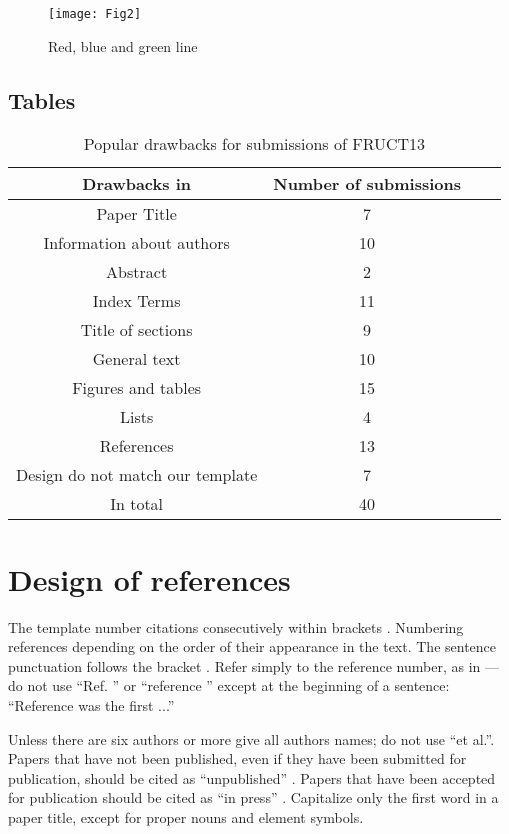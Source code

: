 \documentclass[conference]{IEEEtran}
\begin{document}
\begin{figure}[h]
	\centering
	\texttt{[image: Fig2]}
	\caption{Red, blue and green line}
	\label{fig2}
\end{figure}

\subsection{Tables}

\begin{table}[h]
\centering
\label{tab1}
\caption{Popular drawbacks for submissions of FRUCT13}\vspace{4pt}
\begin{tabular}{|c|c|c|c|}

		\hline
 		\textbf{Drawbacks in} & \textbf{Number of submissions} \\
 		\hline
		Paper Title & 7 \\
		\hline
		Information about authors & 10 \\
		\hline
		Abstract & 2 \\
		\hline
		Index Terms & 11 \\
		\hline
		Title of sections & 9 \\
		\hline
		General text & 10 \\
		\hline
		Figures and tables & 15 \\
		\hline
		Lists & 4 \\
		\hline
		References & 13 \\
		\hline
		Design do not match our template & 7 \\
		\hline
		In total & 40 \\
		\hline
\end{tabular}
\end{table}

\section{Design of references}

The template number citations consecutively within brackets \cite{Cover}. Numbering references depending on the order of their appearance in the text. The sentence punctuation follows the bracket \cite{Dobrushin}. Refer simply to the reference number, as in \cite{Blachman} --- do not use ``Ref. \cite{Blachman}'' or ``reference \cite{Blachman}'' except at the beginning of a sentence: ``Reference \cite{Blachman} was the first ...''

Unless there are six authors or more give all authors names; do not use ``et al.''. Papers that have not been published, even if they have been submitted for publication, should be cited as ``unpublished'' \cite{Elissa}. Papers that have been accepted for publication should be cited as ``in press'' \cite{Nicole}. Capitalize only the first word in a paper title, except for proper nouns and element symbols.
\end{document}
